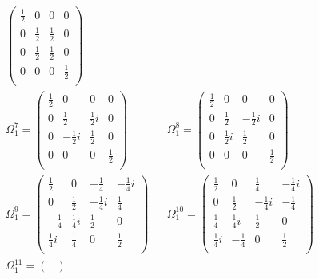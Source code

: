 \begin{align*}
\begin{pmatrix}
    \frac{1}{2}  &  0  &  0  &  0  \\
    0  &  \frac{1}{2}  &  \frac{1}{2}  &  0  \\
    0  &  \frac{1}{2}  &  \frac{1}{2}  &  0  \\
    0  &  0  &  0  &  \frac{1}{2}  \\
    \end{pmatrix}
    \\
    \Omega_{1}^{7} = 
    \begin{pmatrix}
    \frac{1}{2}  &  0  &  0  &  0  \\
    0  &  \frac{1}{2}  &  \frac{1}{2}i  &  0  \\
    0  &  -\frac{1}{2}i  &  \frac{1}{2}  &  0  \\
    0  &  0  &  0  &  \frac{1}{2}  \\
    \end{pmatrix}
    &&
    \Omega_{1}^{8} = 
    \begin{pmatrix}
    \frac{1}{2}  &  0  &  0  &  0  \\
    0  &  \frac{1}{2}  &  -\frac{1}{2}i  &  0  \\
    0  &  \frac{1}{2}i  &  \frac{1}{2}  &  0  \\
    0  &  0  &  0  &  \frac{1}{2}  \\
    \end{pmatrix}
    \\
    \Omega_{1}^{9} = 
    \begin{pmatrix}
    \frac{1}{2}  &  0  &  -\frac{1}{4}  &  -\frac{1}{4}i  \\
    0  &  \frac{1}{2}  &  -\frac{1}{4}i  &  \frac{1}{4}  \\
    -\frac{1}{4}  &  \frac{1}{4}i  &  \frac{1}{2}  &  0  \\
    \frac{1}{4}i  &  \frac{1}{4}  &  0  &  \frac{1}{2}  \\
    \end{pmatrix}
    &&
    \Omega_{1}^{10} = 
    \begin{pmatrix}
    \frac{1}{2}  &  0  &  \frac{1}{4}  &  -\frac{1}{4}i  \\
    0  &  \frac{1}{2}  &  -\frac{1}{4}i  &  -\frac{1}{4}  \\
    \frac{1}{4}  &  \frac{1}{4}i  &  \frac{1}{2}  &  0  \\
    \frac{1}{4}i  &  -\frac{1}{4}  &  0  &  \frac{1}{2}  \\
    \end{pmatrix}
    \\
    \Omega_{1}^{11} = 
    \begin{pmatrix}

\end{pmatrix}
\end{align*}
